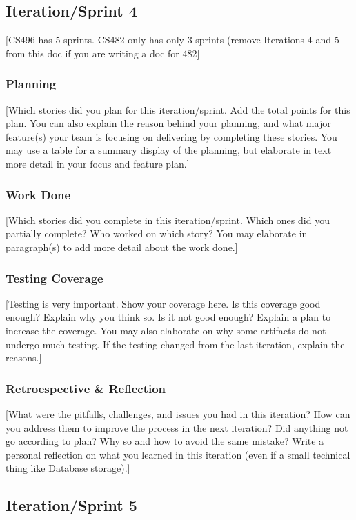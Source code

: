 \documentclass{article}
\begin{document}
\subsection{Iteration/Sprint 4}
[CS496 has 5 sprints. CS482 only has only 3 sprints (remove Iterations 4 and 5 from this doc if you are writing a doc for 482]

\subsubsection{Planning}
[Which stories did you plan for this iteration/sprint. Add the total points for this plan. You can also explain the reason behind your planning, and what major feature(s) your team is focusing on delivering by completing these stories. You may use a table for a summary display of the planning, but elaborate in text more detail in your focus and feature plan.]

\subsubsection{Work Done}
[Which stories did you complete in this iteration/sprint. Which ones did you partially complete? Who worked on which story? You may elaborate in paragraph(s) to add more detail about the work done.]

\subsubsection{Testing Coverage}
[Testing is very important. Show your coverage here. Is this coverage good enough? Explain why you think so. Is it not good enough? Explain a plan to increase the coverage. You may also elaborate on why some artifacts do not undergo much testing. If the testing changed from the last iteration, explain the reasons.]

\subsubsection{Retroespective \& Reflection}
[What were the pitfalls, challenges, and issues you had in this iteration? How can you address them to improve the process in the next iteration? Did anything not go according to plan? Why so and how to avoid the same mistake? Write a personal reflection on what you learned in this iteration (even if a small technical thing like Database storage).]

\subsection{Iteration/Sprint 5}
\end{document}
